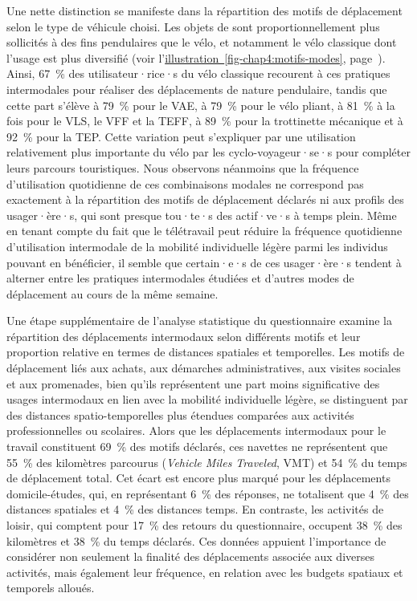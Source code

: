 \begin{refsegment}
Une nette distinction se manifeste dans la répartition des motifs de déplacement selon le type de véhicule choisi. Les objets de  sont proportionnellement plus sollicités à des fins pendulaires que le vélo, et notamment le vélo classique dont l'usage est plus diversifié (voir l'\hyperref[fig-chap4:motifs-modes]{illustration~\ref{fig-chap4:motifs-modes}}, page~\pageref{fig-chap4:motifs-modes}). Ainsi, 67~\% des utilisateur·rice·s du vélo classique recourent à ces pratiques intermodales pour réaliser des déplacements de nature pendulaire, tandis que cette part s'élève à 79~\% pour le \acrshort{VAE}, à 79~\% pour le vélo pliant, à 81~\% à la fois pour le \acrshort{VLS}, le \acrshort{VFF} et la \acrshort{TEFF}, à 89~\% pour la trottinette mécanique et à 92~\% pour la \acrshort{TEP}. Cette variation peut s'expliquer par une utilisation relativement plus importante du vélo par les cyclo-voyageur·se·s pour compléter leurs parcours touristiques. Nous observons néanmoins que la fréquence d'utilisation quotidienne de ces combinaisons modales ne correspond pas exactement à la répartition des motifs de déplacement déclarés ni aux profils des usager·ère·s, qui sont presque tou·te·s des actif·ve·s à temps plein. Même en tenant compte du fait que le télétravail peut réduire la fréquence quotidienne d'utilisation intermodale de la mobilité individuelle légère parmi les individus pouvant en bénéficier, il semble que certain·e·s de ces usager·ère·s tendent à alterner entre les pratiques intermodales étudiées et d'autres modes de déplacement au cours de la même semaine.%

Une étape supplémentaire de l'analyse statistique du questionnaire examine la répartition des déplacements intermodaux selon différents motifs et leur proportion relative en termes de distances spatiales et temporelles. Les motifs de déplacement liés aux achats, aux démarches administratives, aux visites sociales et aux promenades, bien qu'ils représentent une part moins significative des usages intermodaux en lien avec la mobilité individuelle légère, se distinguent par des distances spatio-temporelles plus étendues comparées aux activités professionnelles ou scolaires. Alors que les déplacements intermodaux pour le travail constituent 69~\% des motifs déclarés, ces navettes ne représentent que 55~\% des kilomètres parcourus (\textsl{Vehicle Miles Traveled}, VMT) et 54~\% du temps de déplacement total. Cet écart est encore plus marqué pour les déplacements domicile-études, qui, en représentant 6~\% des réponses, ne totalisent que 4~\% des distances spatiales et 4~\% des distances temps. En contraste, les activités de loisir, qui comptent pour 17~\% des retours du questionnaire, occupent 38~\% des kilomètres et 38~\% du temps déclarés. Ces données appuient l'importance de considérer non seulement la finalité des déplacements associée aux diverses activités, mais également leur fréquence, en relation avec les budgets spatiaux et temporels alloués.%


\end{refsegment}
